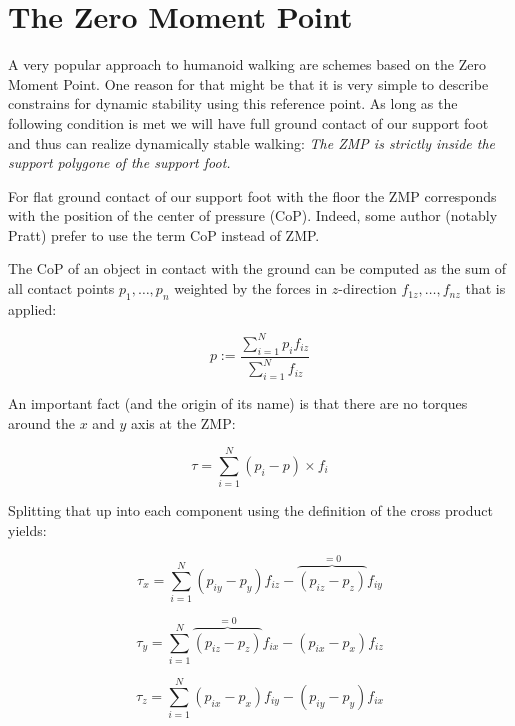\documentclass[english,ngerman]{KITreprt}
\begin{document}
\section{The Zero Moment Point}\label{the-zero-moment-point}

A very popular approach to humanoid walking are schemes based on the
Zero Moment Point. One reason for that might be that it is very simple
to describe constrains for dynamic stability using this reference point.
As long as the following condition is met we will have full ground
contact of our support foot and thus can realize dynamically stable
walking: \emph{The ZMP is strictly inside the support polygone of the
support foot.}

For flat ground contact of our support foot with the floor the ZMP
corresponds with the position of the center of pressure (CoP). Indeed,
some author (notably Pratt) prefer to use the term CoP instead of ZMP.

The CoP of an object in contact with the ground can be computed as the
sum of all contact points $p_1, \dots, p_n$ weighted by the forces in
$z$-direction $f_{1z}, \dots, f_{nz}$ that is applied:

\begin{equation} \label{eq:zmp-definition}
p := \frac{\sum^N_{i=1}p_i f_{iz}}{\sum^N_{i=1} f_{iz}}
\end{equation}

An important fact (and the origin of its name) is that there are no
torques around the $x$ and $y$ axis at the ZMP:

\begin{equation}
\tau = \sum^N_{i=1} (p_i - p) \times f_i
\end{equation}

Splitting that up into each component using the definition of the cross
product yields:

\begin{equation}
\tau_x = \sum^N_{i=1} (p_{iy} - p_y) f_{iz} - \overbrace{(p_{iz} - p_z)}^{=0} f_{iy}
\end{equation}

\begin{equation}
\tau_y = \sum^N_{i=1} \overbrace{(p_{iz} - p_z)}^{=0} f_{ix} - (p_{ix} - p_x) f_{iz}
\end{equation}

\begin{equation}
\tau_z = \sum^N_{i=1} (p_{ix} - p_x) f_{iy} - (p_{iy} - p_y) f_{ix}
\end{equation}
\end{document}
